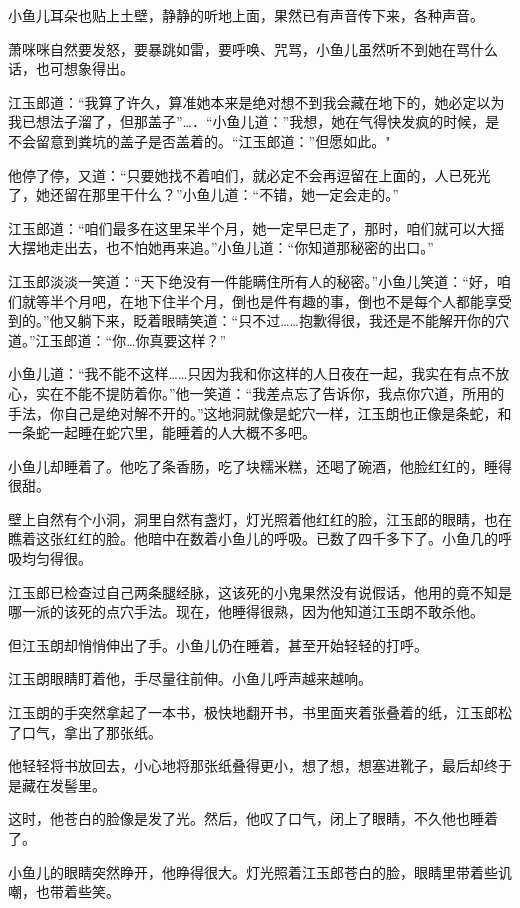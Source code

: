 \documentclass[12pt,oneside]{book}
\begin{document}
小鱼儿耳朵也贴上土壁，静静的听地上面，果然已有声音传下来，各种声音。

萧咪咪自然要发怒，要暴跳如雷，要呼唤、咒骂，小鱼儿虽然听不到她在骂什么话，也可想象得出。

江玉郎道：``我算了许久，算准她本来是绝对想不到我会藏在地下的，她必定以为我已想法子溜了，但那盖子''\ldots．``小鱼儿道：''我想，她在气得快发疯的时候，是不会留意到粪坑的盖子是否盖着的。``江玉郎道：''但愿如此。"

他停了停，又道：``只要她找不着咱们，就必定不会再逗留在上面的，人已死光了，她还留在那里干什么？''小鱼儿道：``不错，她一定会走的。''

江玉郎道：``咱们最多在这里呆半个月，她一定早巳走了，那时，咱们就可以大摇大摆地走出去，也不怕她再来追。''小鱼儿道：``你知道那秘密的出口。''

江玉郎淡淡一笑道：``天下绝没有一件能瞒住所有人的秘密。''小鱼儿笑道：``好，咱们就等半个月吧，在地下住半个月，倒也是件有趣的事，倒也不是每个人都能享受到的。''他又躺下来，眨着眼睛笑道：``只不过\ldots\ldots 抱歉得很，我还是不能解开你的穴道。''江玉郎道：``你\ldots 你真要这样？''

小鱼儿道：``我不能不这样\ldots\ldots 只因为我和你这样的人日夜在一起，我实在有点不放心，实在不能不提防着你。''他一笑道：``我差点忘了告诉你，我点你穴道，所用的手法，你自己是绝对解不开的。''这地洞就像是蛇穴一样，江玉朗也正像是条蛇，和一条蛇一起睡在蛇穴里，能睡着的人大概不多吧。

小鱼儿却睡着了。他吃了条香肠，吃了块糯米糕，还喝了碗酒，他脸红红的，睡得很甜。

壁上自然有个小洞，洞里自然有盏灯，灯光照着他红红的脸，江玉郎的眼睛，也在瞧着这张红红的脸。他暗中在数着小鱼儿的呼吸。已数了四千多下了。小鱼几的呼吸均匀得很。

江玉郎已检查过自己两条腿经脉，这该死的小鬼果然没有说假话，他用的竟不知是哪一派的该死的点穴手法。现在，他睡得很熟，因为他知道江玉朗不敢杀他。

但江玉朗却悄悄伸出了手。小鱼儿仍在睡着，甚至开始轻轻的打呼。

江玉朗眼睛盯着他，手尽量往前伸。小鱼儿呼声越来越响。

江玉朗的手突然拿起了一本书，极快地翻开书，书里面夹着张叠着的纸，江玉郎松了口气，拿出了那张纸。

他轻轻将书放回去，小心地将那张纸叠得更小，想了想，想塞进靴子，最后却终于是藏在发髻里。

这时，他苍白的脸像是发了光。然后，他叹了口气，闭上了眼睛，不久他也睡着了。

小鱼儿的眼睛突然睁开，他睁得很大。灯光照着江玉郎苍白的脸，眼睛里带着些讥嘲，也带着些笑。
\end{document}
